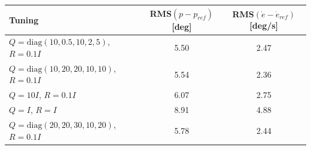 \begin{tabular}{lcc}
\hline
Tuning & RMS$(p - p_{ref})$ [deg] & RMS$(\dot{e} - \dot{e}_{ref})$ [deg/s] \\
\hline
$Q = \mathrm{diag}(10, 0.5, 10, 2, 5)$, $R = 0.1I$ & 5.50 & 2.47 \\
$Q = \mathrm{diag}(10, 20, 20, 10, 10)$, $R = 0.1I$ & 5.54 & 2.36 \\
$Q = 10I$, $R = 0.1I$ & 6.07 & 2.75 \\
$Q = I$, $R = I$ & 8.91 & 4.88 \\
$Q = \mathrm{diag}(20, 20, 30, 10, 20)$, $R = 0.1I$ & 5.78 & 2.44 \\
\hline
\end{tabular}
